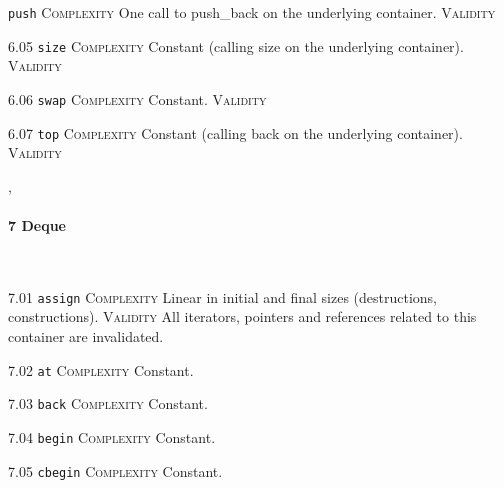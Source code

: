  \texttt{push} \textsc{Complexity} One call to push\_back on the underlying container. \textsc{Validity} \vspace{0.5em}

\noindent\textcolor{cgreen}{6.05 \texttt{size}} \textsc{Complexity} Constant (calling size on the underlying container). \textsc{Validity} \vspace{0.5em}

\noindent\textcolor{cgreen}{6.06 \texttt{swap}} \textsc{Complexity} Constant. \textsc{Validity} \vspace{0.5em}

\noindent\textcolor{cgreen}{6.07 \texttt{top}} \textsc{Complexity} Constant (calling back on the underlying container). \textsc{Validity} \vspace{0.5em}


\sep
{}
\paragraph{7 Deque}\mbox{}\\
\noindent\textcolor{corange}{7.01 \texttt{assign}} \textsc{Complexity} Linear in initial and final sizes (destructions, constructions). \textsc{Validity} All iterators, pointers and references related to this container are invalidated.\vspace{0.5em}

\noindent\textcolor{cgreen}{7.02 \texttt{at}} \textsc{Complexity} Constant. \vspace{0.5em}

\noindent\textcolor{cgreen}{7.03 \texttt{back}} \textsc{Complexity} Constant. \vspace{0.5em}

\noindent\textcolor{cgreen}{7.04 \texttt{begin}} \textsc{Complexity} Constant. \vspace{0.5em}

\noindent\textcolor{cgreen}{7.05 \texttt{cbegin}} \textsc{Complexity} Constant. \vspace{0.5em}

